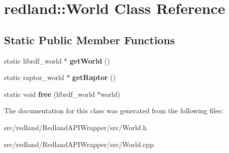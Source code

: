 \hypertarget{classredland_1_1World}{}\section{redland\+:\+:World Class Reference}
\label{classredland_1_1World}
\subsection*{Static Public Member Functions}
\begin{DoxyCompactItemize}
\item 
\mbox{\label{classredland_1_1World_ad7618363c9b7da4c87367707c1a159d7}} 
static librdf\+\_\+world $\ast$ {\bfseries get\+World} ()
\item 
\mbox{\label{classredland_1_1World_aac0ce4018279ced7b38a36d74bb10cec}} 
static raptor\+\_\+world $\ast$ {\bfseries get\+Raptor} ()
\item 
\mbox{\label{classredland_1_1World_ade64918f10ee6ee0f5b8a0cb2e01666b}} 
static void {\bfseries free} (librdf\+\_\+world $\ast$world)
\end{DoxyCompactItemize}


The documentation for this class was generated from the following files\+:\begin{DoxyCompactItemize}
\item 
src/redland/\+Redland\+A\+P\+I\+Wrapper/src/World.\+h\item 
src/redland/\+Redland\+A\+P\+I\+Wrapper/src/World.\+cpp\end{DoxyCompactItemize}
